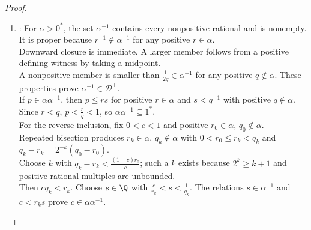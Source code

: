 \begin{theorem}
\begin{proof}
\begin{enumerate}[label=(\roman*)]
\begin{enumerate}[label=(\alph*)]
Since $st\in\beta\gamma$, $p\in\alpha(\beta\gamma)$. The reverse inclusion is symmetric, so multiplication is associative.\\
If $p\in\alpha(\beta+\gamma)$, choose positive $r\in\alpha$, $u=s_0+t_0\in\beta+\gamma$ with $p\leq ru$, and then positive $s\in\beta$, $t\in\gamma$ with $s>s_0$, $t>t_0$.\\
The membership $p\in\alpha\beta+\alpha\gamma$ follows from $p<r(s+t)=rs+rt$.\\
Conversely, if $p=u+v$ with $u\in\alpha\beta$ and $v\in\alpha\gamma$, choose positive witnesses $u\leq r_1s$, $v\leq r_2t$, and $r\in\alpha$ with $r>\max\{r_1,r_2\}$.\\
Then $p<r(s+t)$ with $s+t\in\beta+\gamma$, so $p\in\alpha(\beta+\gamma)$. Thus positive multiplication distributes over addition.\\
If $p\leq rs$ with $r\in\alpha$, $0<s<1$, then $p<r$ and $p\in\alpha$. Conversely, for $p\in\alpha$, choose $p<r\in\alpha$ and $0<s<1$ with $p\leq rs$.\\
Such an $s$ exists when $p>0$, while any $s>0$ works when $p\leq0$. Hence $\alpha1^*=\alpha$, and $\alpha,\beta>0^*\Rightarrow\alpha\beta>0^*$.
\item {}: For $\alpha>0^*$, the set $\alpha^{-1}$ contains every nonpositive rational and is nonempty.\\
It is proper because $r^{-1}\notin\alpha^{-1}$ for any positive $r\in\alpha$.\\
Downward closure is immediate. A larger member follows from a positive defining witness by taking a midpoint.\\
A nonpositive member is smaller than $\frac{1}{2q}\in\alpha^{-1}$ for any positive $q\notin\alpha$. These properties prove $\alpha^{-1}\in\mathscr{D}^+$.\\
If $p\in\alpha\alpha^{-1}$, then $p\leq rs$ for positive $r\in\alpha$ and $s<q^{-1}$ with positive $q\notin\alpha$. Since $r<q$, $p<\frac{r}{q}<1$, so $\alpha\alpha^{-1}\subseteq1^*$.\\
For the reverse inclusion, fix $0<c<1$ and positive $r_0\in\alpha$, $q_0\notin\alpha$.\\
Repeated bisection produces $r_k\in\alpha$, $q_k\notin\alpha$ with $0<r_0\leq r_k<q_k$ and $q_k-r_k=2^{-k}(q_0-r_0)$.\\
Choose $k$ with $q_k-r_k<\frac{(1-c)r_0}{c}$; such a $k$ exists because $2^k\geq k+1$ and positive rational multiples are unbounded.\\
Then $cq_k<r_k$. Choose $s\in\Q$ with $\frac{c}{r_k}<s<\frac{1}{q_k}$. The relations $s\in\alpha^{-1}$ and $c<r_ks$ prove $c\in\alpha\alpha^{-1}$.\\

\end{enumerate}
\end{enumerate}
\end{proof}
\end{theorem}
